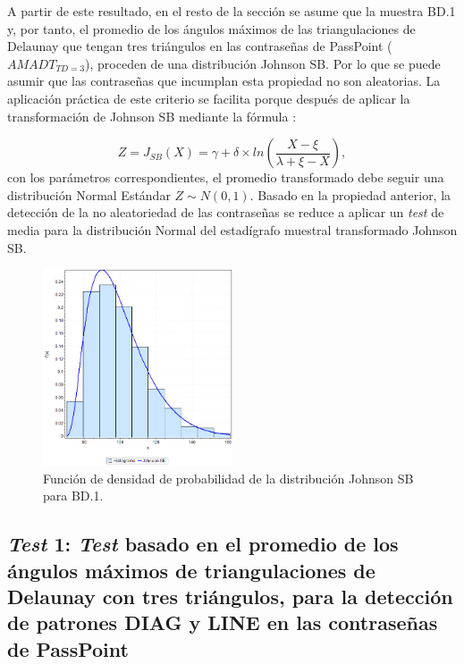 \documentclass[12pt]{report}
\begin{document}
	 A partir de este resultado, en el resto de la sección se asume que la muestra BD.1 y, por tanto, el promedio de los ángulos máximos de las triangulaciones de Delaunay que tengan tres triángulos en las contraseñas de PassPoint ($AMADT_{TD=3}$), proceden de una distribución Johnson SB. Por lo que se puede asumir que las contraseñas que incumplan esta propiedad no son aleatorias.
	 La aplicación práctica de este criterio se facilita porque después de  aplicar la transformación de Johnson SB mediante la fórmula \cite{30} :
	 
	  
	 \[
	  Z=J_{SB}(X) = \gamma + \delta \times ln\left(\frac{X - \xi}{\lambda + \xi - X}\right),
	 \]
	 con los parámetros correspondientes, el promedio transformado debe seguir una distribución Normal Estándar $Z\sim N(0,1)$. Basado en la propiedad anterior, la detección de la no aleatoriedad de las contraseñas se reduce a aplicar un \textit{test} de media para la distribución Normal del estadígrafo muestral transformado Johnson SB.
	 \begin{figure}[ht]
	 	\centering
	 	
	 	\includegraphics[width=0.5\textwidth]{3td_fdp.png}
	 	\caption{Función de densidad de probabilidad de la  distribución Johnson SB para BD.1.}
	 	\label{3TD_FDP}
	 \end{figure}
	 
	 
\subsection{\textit{Test} 1: \textit{Test} basado en el promedio de los ángulos máximos de triangulaciones de Delaunay con tres triángulos, para la detección de patrones DIAG y LINE en las contraseñas de PassPoint}
\label{sec:1.2}
\end{document}
